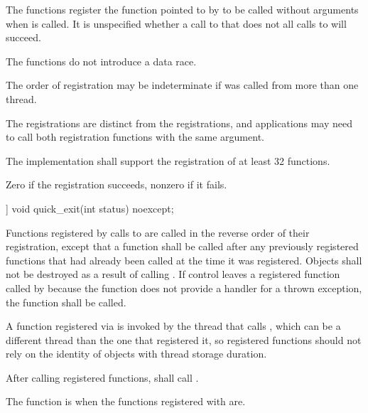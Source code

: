 \begin{itemdescr}
\pnum
\effects The  functions register the function pointed to by 
to be called without arguments when  is called.
It is unspecified whether a call to  that does not
all calls to  will succeed. \begin{note} The
 functions do not introduce a
data race. \end{note}
\begin{note}
The order of registration may be indeterminate if  was called from more
than one thread.
\end{note}
\begin{note} The
 registrations are distinct from the  registrations,
and applications may need to call both registration functions with the same argument.
\end{note}

\pnum
\implimits
The implementation shall support the registration of at least 32 functions.

\pnum
\returns Zero if the registration succeeds, nonzero if it fails.
\end{itemdescr}

%
\begin{itemdecl}
[[noreturn]] void quick_exit(int status) noexcept;
\end{itemdecl}

\begin{itemdescr}
\pnum
\effects Functions registered by calls to  are called in the
reverse order of their registration, except that a function shall be called after any
previously registered functions that had already been called at the time it was
registered. Objects shall not be destroyed as a result of calling .
If control leaves a registered function called by  because the
function does not provide a handler for a thrown exception, the function  shall
be called.
\begin{note}
A function registered via 
is invoked by the thread that calls ,
which can be a different thread
than the one that registered it, so registered functions should not rely on the identity
of objects with thread storage duration.
\end{note}
After calling registered functions,  shall call .

\pnum
\remarks
{}%
The function  is 
when the functions registered with  are.
\end{itemdescr}

